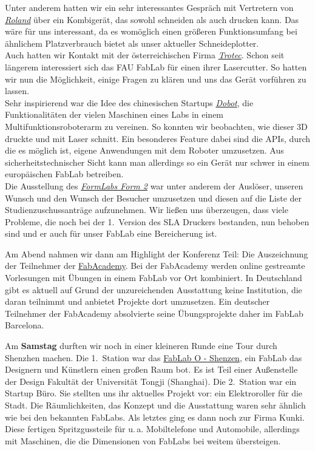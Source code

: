 \documentclass{\basedir/fablab-document}
\begin{document}
Unter anderem hatten wir ein sehr interessantes Gespräch mit Vertretern
von \href{http://www.rolanddg.com/}{\emph{Roland}} über ein Kombigerät,
das sowohl schneiden als auch drucken kann. Das wäre für uns
interessant, da es womöglich einen größeren Funktionsumfang bei
ähnlichem Platzverbrauch bietet als unser aktueller Schneideplotter.\\
Auch hatten wir Kontakt mit der österreichischen Firma
\href{https://www.troteclaser.com/}{\emph{Trotec}}. Schon seit längerem
interessiert sich das FAU FabLab für einen ihrer Lasercutter. So hatten
wir nun die Möglichkeit, einige Fragen zu klären und uns das Gerät
vorführen zu lassen.\\
Sehr inspirierend war die Idee des chinesischen
Startups \href{http://dobot.cc/}{\emph{Dobot}}, die Funktionalitäten der
vielen Maschinen eines Labs in einem Multifunktionsroboterarm zu
vereinen. So konnten wir beobachten, wie dieser 3D druckte und mit Laser
schnitt. Ein besonderes Feature dabei sind die APIs, durch die es möglich
ist, eigene Anwendungen mit dem Roboter umzusetzen. Aus
sicherheitstechnischer Sicht kann man allerdings so ein Gerät nur schwer
in einem europäischen FabLab betreiben.\\
Die Ausstellung des
\href{https://formlabs.com/}{\emph{FormLabs Form 2}} war unter anderem der
Auslöser, unseren Wunsch und den Wunsch der Besucher umzusetzen und diesen auf die Liste der
Studienzuschussanträge aufzunehmen. Wir ließen uns überzeugen, dass viele
Probleme, die noch bei der 1.\ Version des SLA Druckers bestanden, nun
behoben sind und er auch für unser FabLab eine Bereicherung ist.

Am Abend nahmen wir dann am Highlight der Konferenz Teil: Die
Auszeichnung der Teilnehmer der
\href{http://fabacademy.org/}{FabAcademy}. Bei der FabAcademy werden
online gestreamte Vorlesungen mit Übungen in einem FabLab vor Ort
kombiniert. In Deutschland gibt es aktuell auf Grund der unzureichenden
Ausstattung keine Institution, die daran teilnimmt und anbietet Projekte dort
umzusetzen. Ein deutscher Teilnehmer der FabAcademy absolvierte seine
Übungsprojekte daher im FabLab Barcelona.

Am \textbf{Samstag} durften wir noch in einer kleineren Runde eine Tour
durch Shenzhen machen. Die 1.\ Station war das
\href{https://www.fablabs.io/fablaboshenzhen}{FabLab O - Shenzen}, ein
FabLab das Designern und Künstlern einen großen Raum bot. Es ist
Teil einer Außenstelle der Design Fakultät der Universität Tongji
(Shanghai). Die 2.\ Station war ein Startup Büro. Sie stellten uns ihr
aktuelles Projekt vor: ein Elektroroller für die Stadt. Die
Räumlichkeiten, das Konzept und die Ausstattung waren sehr ähnlich wie
bei den bekannten FabLabs. Als letztes ging es dann noch zur Firma
Kunki. Diese fertigen Spritzgussteile für u.\,a. Mobiltelefone und
Automobile, allerdings mit Maschinen, die die Dimensionen von FabLabs
bei weitem übersteigen.
\end{document}
